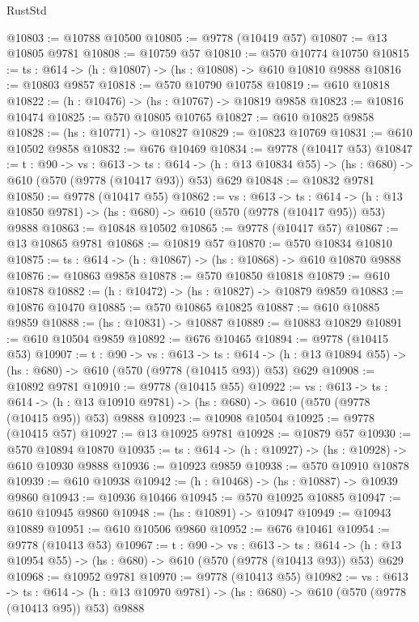 \begin{lexlean}{RustStd}
\begin{coremodule}
@10803 := @10788 @10500
@10805 := @9778 (@10419 @57)
@10807 := @13 @10805 @9781
@10808 := @10759 @57
@10810 := @570 @10774 @10750
@10815 := {ts : @614} -> (h : @10807) -> (hs : @10808) -> @610 @10810 @9888
@10816 := @10803 @9857
@10818 := @570 @10790 @10758
@10819 := @610 @10818
@10822 := (h : @10476) -> (hs : @10767) -> @10819 @9858
@10823 := @10816 @10474
@10825 := @570 @10805 @10765
@10827 := @610 @10825 @9858
@10828 := (hs : @10771) -> @10827
@10829 := @10823 @10769
@10831 := @610 @10502 @9858
@10832 := @676 @10469
@10834 := @9778 (@10417 @53)
@10847 := {t : @90} ->
  {vs : @613} ->
  {ts : @614} -> (h : @13 @10834 @55) -> (hs : @680) -> @610 (@570 (@9778 (@10417 @93)) @53) @629
@10848 := @10832 @9781
@10850 := @9778 (@10417 @55)
@10862 := {vs : @613} ->
  {ts : @614} -> (h : @13 @10850 @9781) -> (hs : @680) -> @610 (@570 (@9778 (@10417 @95)) @53) @9888
@10863 := @10848 @10502
@10865 := @9778 (@10417 @57)
@10867 := @13 @10865 @9781
@10868 := @10819 @57
@10870 := @570 @10834 @10810
@10875 := {ts : @614} -> (h : @10867) -> (hs : @10868) -> @610 @10870 @9888
@10876 := @10863 @9858
@10878 := @570 @10850 @10818
@10879 := @610 @10878
@10882 := (h : @10472) -> (hs : @10827) -> @10879 @9859
@10883 := @10876 @10470
@10885 := @570 @10865 @10825
@10887 := @610 @10885 @9859
@10888 := (hs : @10831) -> @10887
@10889 := @10883 @10829
@10891 := @610 @10504 @9859
@10892 := @676 @10465
@10894 := @9778 (@10415 @53)
@10907 := {t : @90} ->
  {vs : @613} ->
  {ts : @614} -> (h : @13 @10894 @55) -> (hs : @680) -> @610 (@570 (@9778 (@10415 @93)) @53) @629
@10908 := @10892 @9781
@10910 := @9778 (@10415 @55)
@10922 := {vs : @613} ->
  {ts : @614} -> (h : @13 @10910 @9781) -> (hs : @680) -> @610 (@570 (@9778 (@10415 @95)) @53) @9888
@10923 := @10908 @10504
@10925 := @9778 (@10415 @57)
@10927 := @13 @10925 @9781
@10928 := @10879 @57
@10930 := @570 @10894 @10870
@10935 := {ts : @614} -> (h : @10927) -> (hs : @10928) -> @610 @10930 @9888
@10936 := @10923 @9859
@10938 := @570 @10910 @10878
@10939 := @610 @10938
@10942 := (h : @10468) -> (hs : @10887) -> @10939 @9860
@10943 := @10936 @10466
@10945 := @570 @10925 @10885
@10947 := @610 @10945 @9860
@10948 := (hs : @10891) -> @10947
@10949 := @10943 @10889
@10951 := @610 @10506 @9860
@10952 := @676 @10461
@10954 := @9778 (@10413 @53)
@10967 := {t : @90} ->
  {vs : @613} ->
  {ts : @614} -> (h : @13 @10954 @55) -> (hs : @680) -> @610 (@570 (@9778 (@10413 @93)) @53) @629
@10968 := @10952 @9781
@10970 := @9778 (@10413 @55)
@10982 := {vs : @613} ->
  {ts : @614} -> (h : @13 @10970 @9781) -> (hs : @680) -> @610 (@570 (@9778 (@10413 @95)) @53) @9888

\end{coremodule}
\end{lexlean}
